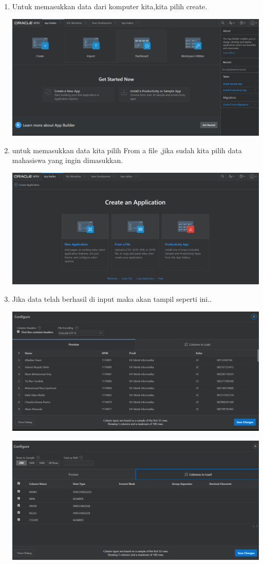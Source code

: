 \documentclass{article}
\begin{document}
\begin{enumerate}
\begin{center}
\end{center}
    \item Untuk memasukkan data dari komputer kita,kita pilih create.
    \begin{center}
    \includegraphics[width=.8\textwidth]{4.PNG}
\end{center}
    \item untuk memasukkan data kita pilih From a file ,jika sudah kita pilih data mahasiswa yang ingin dimasukkan.
    \begin{center}
    \includegraphics[width=.8\textwidth]{5.PNG}
\end{center}
    \item Jika data telah berhasil di input maka akan tampil seperti ini..
    \begin{center}
    \includegraphics[width=.8\textwidth]{6.PNG}
\end{center}
\begin{center}
    \includegraphics[width=.8\textwidth]{7.PNG}

\end{center}
\end{enumerate}
\end{document}
